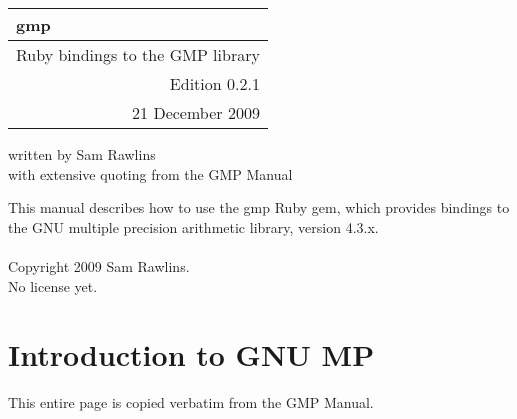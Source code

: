 \documentclass[pdftex,10pt]{article}
\newlength{\titrwidth}
\begin{document}
\begin{tabular}{p{1.0in} p{\titrwidth}}
\huge{gmp} &\\
\midrule[3pt]
\multicolumn{2}{r}{\large{Ruby bindings to the GMP library}}\\
\multicolumn{2}{r}{\large{Edition 0.2.1}}\\
\multicolumn{2}{r}{\large{21 December 2009}}
\end{tabular}

\vfill
\large{written by Sam Rawlins}\\
\large{with extensive quoting from the GMP Manual}
\newpage

\vfill
This manual describes how to use the gmp Ruby gem, which provides bindings to
the GNU multiple precision arithmetic library, version 4.3.x.\\
\\
Copyright 2009 Sam Rawlins.\\
No license yet.
\newpage

\tableofcontents
\newpage

\section{Introduction to GNU MP}

This entire page is copied verbatim from the GMP Manual.\\\\
\end{document}
